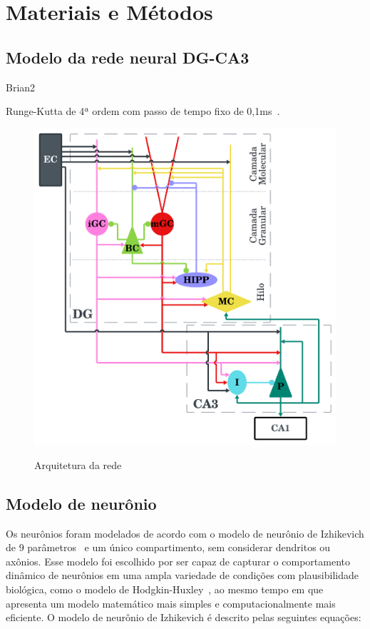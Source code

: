 \chapter{Materiais e Métodos}

\section{Modelo da rede neural DG-CA3}


Brian2~\cite{stimbergBrian2019a}

Runge-Kutta de 4ª ordem com passo de tempo fixo de 0,1ms~\cite{butcherHistory1996}.

\begin{figure}
    \centering
    \caption{Arquitetura da rede}
    \includegraphics[scale=0.7]{figuras/arquitetura-rede.png}
    \label{fig:arquitetura-rede}
\end{figure}


\section{Modelo de neurônio}

Os neurônios foram modelados de acordo com o modelo de neurônio de Izhikevich de 9
parâmetros~\cite[cap.~8]{izhikevichDynamical2006} e um único compartimento, sem considerar dendritos ou axônios. Esse modelo foi
escolhido por ser capaz de capturar o comportamento dinâmico de neurônios em uma ampla variedade de condições com plausibilidade
biológica, como o modelo de Hodgkin-Huxley~\cite{hodgkinQuantitative1952b}, ao mesmo tempo em que apresenta um modelo matemático
mais simples e computacionalmente mais eficiente. O modelo de neurônio de Izhikevich é descrito pelas seguintes equações:

